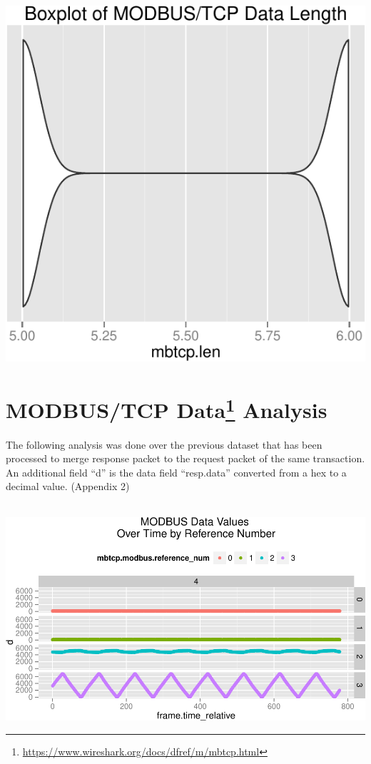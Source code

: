 \documentclass[]{article}
\let\rmarkdownfootnote\footnote%
\def\footnote{\protect\rmarkdownfootnote}
\begin{document}
\begin{center}\includegraphics{modbus_files/figure-latex/unnamed-chunk-17-1} \end{center}

\pagebreak

\section[MODBUS/TCP Data Analysis]{MODBUS/TCP Data\footnote{\url{https://www.wireshark.org/docs/dfref/m/mbtcp.html}}
Analysis}\label{modbustcp-data1-analysis}

The following analysis was done over the previous dataset that has been
processed to merge response packet to the request packet of the same
transaction. An additional field ``d'' is the data field ``resp.data''
converted from a hex to a decimal value. (Appendix 2)
~\\\hspace*{0.333em}\\\hspace*{0.333em}

\includegraphics{modbus_files/figure-latex/unnamed-chunk-18-1.pdf}
\end{document}
